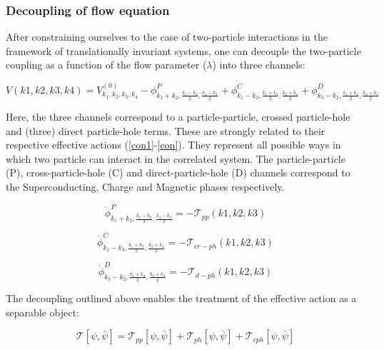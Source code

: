 \documentclass[12pt]{article}
\begin{document}
\subsubsection{Decoupling of flow equation}
After constraining ourselves to the case of two-particle interactions in the framework of translationally invariant systems, one can decouple the two-particle coupling as a function of the flow parameter ($\lambda$) into three channels:

\begin{equation} \label{V decoupling}
    V(k1,k2,k3,k4)= V_{k_1, k_2, k_3, k_4}^{(0)} - \phi^{P}_{k_1 +k_2, \frac{k_1 - k_2}{2}, \frac{k_4-k_3}{2}} + \phi^{C}_{k_1 - k_3, \frac{k_1 +k_3}{2}, \frac{k_2+k_4}{2}} +\phi^{D}_{k_3- k_2, \frac{k_1 + k_4}{2}, \frac{k_2+k_3}{2}}
\end{equation}

\noindent Here, the three channels correspond to a particle-particle, crossed particle-hole and (three) direct particle-hole terms. These are strongly related to their respective effective actions (\ref{con1}-\ref{con}). They represent all possible ways in which two particle can interact in the correlated system. The particle-particle (P), cross-particle-hole (C) and direct-particle-hole (D) channels
correspond to the Superconducting, Charge and Magnetic phases respectively. 

\begin{equation}\label{con1}
    \dot{\phi}^{P}_{k_1 +k_2, \frac{k_1 - k_2}{2}, \frac{k_4-k_3}{2}} = - \mathcal{T}_{pp}(k1,k2,k3)
\end{equation}


\begin{equation}\label{con2}
    \dot{\phi}^{C}_{k_1 - k_3, \frac{k_1 +k_3}{2}, \frac{k_2+k_4}{2}} = - \mathcal{T}_{cr-ph}(k1,k2,k3)
\end{equation}

\begin{equation}\label{con}
    \dot{\phi}^{D}_{k_3- k_2, \frac{k_1 + k_4}{2}, \frac{k_2+k_3}{2}} = - \mathcal{T}_{d-ph}(k1,k2,k3)
\end{equation}

\noindent The decoupling outlined above enables the treatment of the effective action as a separable object:

\begin{equation}
    \mathcal{T}[\psi, \bar{\psi}] = \mathcal{T}_{pp}[\psi, \bar{\psi}] + \mathcal{T}_{ph}[\psi, \bar{\psi}] + \mathcal{T}_{cph}[\psi, \bar{\psi}]
\end{equation}
\end{document}
